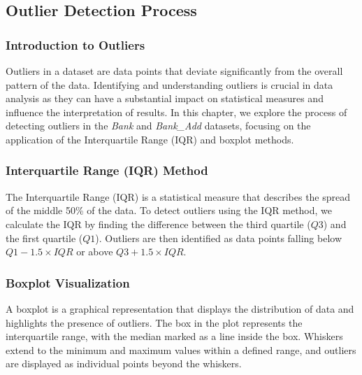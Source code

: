 \documentclass{article}
\begin{document}
           \subsection{Outlier Detection Process}
           \subsubsection{Introduction to Outliers}
           Outliers in a dataset are data points that deviate significantly from the overall pattern of the data. Identifying and understanding outliers is crucial in data analysis as they can have a substantial impact on statistical measures and influence the interpretation of results. In this chapter, we explore the process of detecting outliers in the \textit{Bank }and \textit{Bank\_Add} datasets, focusing on the application of the Interquartile Range (IQR) and boxplot methods.
           \subsubsection{Interquartile Range (IQR) Method}
           The Interquartile Range (IQR) is a statistical measure that describes the spread of the middle 50\% of the data. To detect outliers using the IQR method, we calculate the IQR by finding the difference between the third quartile (\(Q3\)) and the first quartile (\(Q1\)). Outliers are then identified as data points falling below \(Q1 - 1.5 \times IQR\) or above \(Q3 + 1.5 \times IQR\).
           \subsubsection{Boxplot Visualization}
           A boxplot is a graphical representation that displays the distribution of data and highlights the presence of outliers. The box in the plot represents the interquartile range, with the median marked as a line inside the box. Whiskers extend to the minimum and maximum values within a defined range, and outliers are displayed as individual points beyond the whiskers.
           
\end{document}
